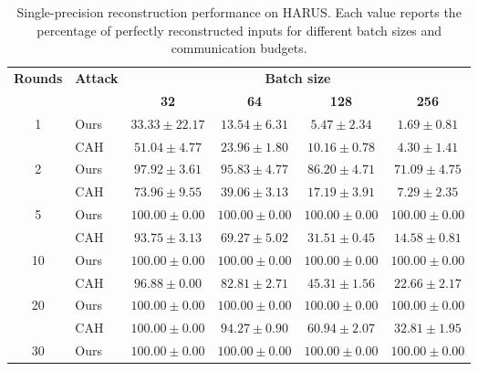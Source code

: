 \begin{table}[t]
    \centering
    \footnotesize
    \setlength{\tabcolsep}{5pt}
    \renewcommand{\arraystretch}{1.08}
    \caption{Single-precision reconstruction performance on HARUS. Each value reports the percentage of perfectly reconstructed inputs for different batch sizes and communication budgets.}
    \label{tab:harus_sp}
    \begin{tabular}{@{}clcccc@{}}
        \toprule
        \textbf{Rounds} & \textbf{Attack} & \multicolumn{4}{c}{\textbf{Batch size}} \\
        \cmidrule(l){3-6}
        & & \textbf{32} & \textbf{64} & \textbf{128} & \textbf{256} \\
        \midrule
        \multirow{2}{*}{1}
        & Ours & $33.33 \pm 22.17$ & $13.54 \pm 6.31$ & $5.47 \pm 2.34$ & $1.69 \pm 0.81$ \\
        & CAH  & $\mathbf{51.04} \pm 4.77$ & $\mathbf{23.96} \pm 1.80$ & $\mathbf{10.16} \pm 0.78$ & $\mathbf{4.30} \pm 1.41$
               \\
        \midrule
        \multirow{2}{*}{2}
        & Ours & $\mathbf{97.92} \pm 3.61$ & $\mathbf{95.83} \pm 4.77$ & $\mathbf{86.20} \pm 4.71$ & $\mathbf{71.09} \pm 4.75$ \\
        & CAH  & $73.96 \pm 9.55$ & $39.06 \pm 3.13$ & $17.19 \pm 3.91$ & $7.29 \pm 2.35$
               \\
        \midrule
        \multirow{2}{*}{5}
        & Ours & $\mathbf{100.00} \pm 0.00$ & $\mathbf{100.00} \pm 0.00$ & $\mathbf{100.00} \pm 0.00$ & $\mathbf{100.00} \pm 0.00$ \\
        & CAH  & $93.75 \pm 3.13$ & $69.27 \pm 5.02$ & $31.51 \pm 0.45$ & $14.58 \pm 0.81$
               \\
        \midrule
        \multirow{2}{*}{10}
        & Ours & $\mathbf{100.00} \pm 0.00$ & $\mathbf{100.00} \pm 0.00$ & $\mathbf{100.00} \pm 0.00$ & $\mathbf{100.00} \pm 0.00$ \\
        & CAH  & $96.88 \pm 0.00$ & $82.81 \pm 2.71$ & $45.31 \pm 1.56$ & $22.66 \pm 2.17$
               \\
        \midrule
        \multirow{2}{*}{20}
        & Ours & $\mathbf{100.00} \pm 0.00$ & $\mathbf{100.00} \pm 0.00$ & $\mathbf{100.00} \pm 0.00$ & $\mathbf{100.00} \pm 0.00$ \\
        & CAH  & $\mathbf{100.00} \pm 0.00$ & $94.27 \pm 0.90$ & $60.94 \pm 2.07$ & $32.81 \pm 1.95$ \\
        \midrule
        \multirow{2}{*}{30}
        & Ours & $\mathbf{100.00} \pm 0.00$ & $\mathbf{100.00} \pm 0.00$ & $\mathbf{100.00} \pm 0.00$ & $\mathbf{100.00} \pm 0.00$ \\

\end{tabular}
\end{table}
